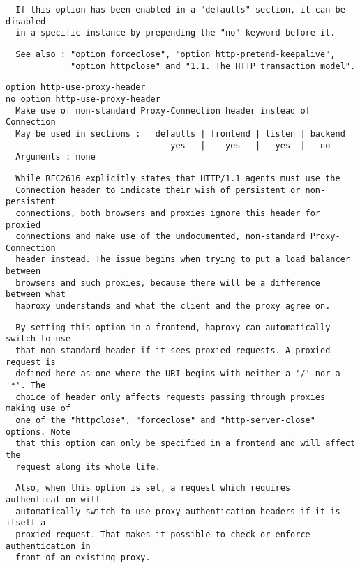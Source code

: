 \begin{verbatim}
  If this option has been enabled in a "defaults" section, it can be disabled
  in a specific instance by prepending the "no" keyword before it.
\end{verbatim}

\begin{verbatim}
  See also : "option forceclose", "option http-pretend-keepalive",
             "option httpclose" and "1.1. The HTTP transaction model".
\end{verbatim}

\begin{verbatim}
option http-use-proxy-header
no option http-use-proxy-header
  Make use of non-standard Proxy-Connection header instead of Connection
  May be used in sections :   defaults | frontend | listen | backend
                                 yes   |    yes   |   yes  |   no
  Arguments : none
\end{verbatim}

\begin{verbatim}
  While RFC2616 explicitly states that HTTP/1.1 agents must use the
  Connection header to indicate their wish of persistent or non-persistent
  connections, both browsers and proxies ignore this header for proxied
  connections and make use of the undocumented, non-standard Proxy-Connection
  header instead. The issue begins when trying to put a load balancer between
  browsers and such proxies, because there will be a difference between what
  haproxy understands and what the client and the proxy agree on.
\end{verbatim}

\begin{verbatim}
  By setting this option in a frontend, haproxy can automatically switch to use
  that non-standard header if it sees proxied requests. A proxied request is
  defined here as one where the URI begins with neither a '/' nor a '*'. The
  choice of header only affects requests passing through proxies making use of
  one of the "httpclose", "forceclose" and "http-server-close" options. Note
  that this option can only be specified in a frontend and will affect the
  request along its whole life.
\end{verbatim}

\begin{verbatim}
  Also, when this option is set, a request which requires authentication will
  automatically switch to use proxy authentication headers if it is itself a
  proxied request. That makes it possible to check or enforce authentication in
  front of an existing proxy.
\end{verbatim}

